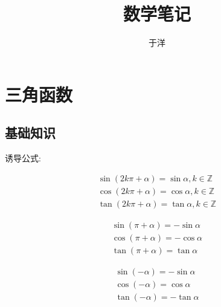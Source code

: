\documentclass[hyperref, UTF8,11pt,a4paper]{ctexart} %
\title{数学笔记}	%
\author{于洋}			%
\date{}					%
\begin{document}
\maketitle

\newpage

\section{三角函数}


\subsection*{基础知识}
诱导公式:
\begin{figure}[!h] %
	\centering
	\begin{minipage}{170pt}
		$$
	\begin{array}{l}{\sin (2 k \pi+\alpha)=\sin \alpha, k \in \mathbb{Z}} \\ {\cos (2 k \pi+\alpha)=\cos \alpha, k \in \mathbb{Z}} \\ {\tan (2 k \pi+\alpha)=\tan \alpha, k \in \mathbb{Z}}\end{array}
	$$
	\end{minipage}
	\hspace{10pt}
	\begin{minipage}{170pt}
		$$
	\begin{array}{c}{\sin (\pi+\alpha)=-\sin \alpha} \\ {\cos (\pi+\alpha)=-\cos \alpha} \\ {\tan (\pi+\alpha)=\tan \alpha}\end{array}
	$$
	\end{minipage}
	\hspace{10pt}
	\begin{minipage}{170pt}
		$$
	\begin{array}{c}{\sin (-\alpha)=-\sin \alpha} \\ {\cos (-\alpha)=\cos \alpha} \\ {\tan (-\alpha)=-\tan \alpha}\end{array}
	$$
	\end{minipage}
\end{figure}
\end{document}
